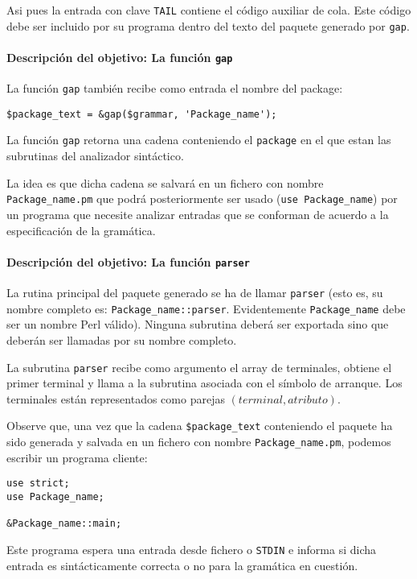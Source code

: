 Asi pues la entrada con clave \verb|TAIL| contiene el código auxiliar de
cola. Este código debe ser incluido por su programa dentro del texto del
paquete generado por \verb|gap|.

\paragraph{Descripción del objetivo: La función {\tt gap}}

La función \verb|gap| también recibe como entrada el nombre 
del package:
\begin{verbatim}
$package_text = &gap($grammar, 'Package_name');
\end{verbatim}
La función \verb|gap| retorna
una cadena conteniendo el \verb|package| en el que estan las subrutinas del
analizador sintáctico. 

La idea es que dicha cadena se salvará en un fichero
con nombre \verb|Package_name.pm| que podrá posteriormente ser usado 
(\verb|use Package_name|) por un programa que necesite analizar entradas
que se conforman de acuerdo a la especificación de la gramática.

\paragraph{Descripción del objetivo: La función {\tt parser}}
La rutina principal del paquete generado se ha de llamar
\verb|parser| (esto es, su nombre completo es: \verb|Package_name::parser|. 
Evidentemente \verb|Package_name| debe ser un nombre Perl válido).
Ninguna subrutina deberá ser exportada sino que deberán ser llamadas
por su nombre completo.

La subrutina \verb|parser| recibe como argumento el array de 
terminales, obtiene el primer terminal y llama a la subrutina
asociada con el símbolo de arranque. Los terminales están representados
como parejas $(terminal, atributo)$.

Observe que, una vez que la cadena \verb|$package_text| conteniendo el paquete ha sido 
generada y salvada en un fichero con nombre \verb|Package_name.pm|, podemos escribir
un programa cliente:

\begin{verbatim}
use strict;
use Package_name;

&Package_name::main;
\end{verbatim}

Este programa espera una entrada desde fichero o \verb|STDIN| e
informa si dicha entrada es sintácticamente correcta o no
para la gramática en cuestión.

